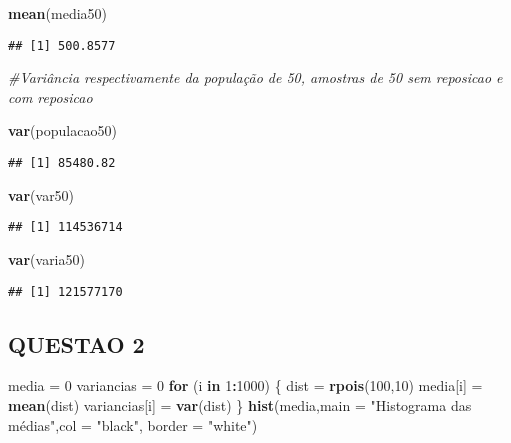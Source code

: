 \documentclass[]{article}
\newenvironment{Shaded}{\begin{snugshade}}{\end{snugshade}}
\newcommand{\KeywordTok}[1]{\textcolor[rgb]{0.13,0.29,0.53}{\textbf{#1}}}
\newcommand{\DataTypeTok}[1]{\textcolor[rgb]{0.13,0.29,0.53}{#1}}
\newcommand{\DecValTok}[1]{\textcolor[rgb]{0.00,0.00,0.81}{#1}}
\newcommand{\StringTok}[1]{\textcolor[rgb]{0.31,0.60,0.02}{#1}}
\newcommand{\CommentTok}[1]{\textcolor[rgb]{0.56,0.35,0.01}{\textit{#1}}}
\newcommand{\ControlFlowTok}[1]{\textcolor[rgb]{0.13,0.29,0.53}{\textbf{#1}}}
\newcommand{\OperatorTok}[1]{\textcolor[rgb]{0.81,0.36,0.00}{\textbf{#1}}}
\newcommand{\NormalTok}[1]{#1}
\begin{document}
\begin{Shaded}
\begin{Highlighting}[]
\KeywordTok{mean}\NormalTok{(media50)}
\end{Highlighting}
\end{Shaded}

\begin{verbatim}
## [1] 500.8577
\end{verbatim}

\begin{Shaded}
\begin{Highlighting}[]
 \CommentTok{#Variância respectivamente da população de 50, amostras de 50 sem reposicao e com reposicao}

\KeywordTok{var}\NormalTok{(populacao50)}
\end{Highlighting}
\end{Shaded}

\begin{verbatim}
## [1] 85480.82
\end{verbatim}

\begin{Shaded}
\begin{Highlighting}[]
\KeywordTok{var}\NormalTok{(var50)}
\end{Highlighting}
\end{Shaded}

\begin{verbatim}
## [1] 114536714
\end{verbatim}

\begin{Shaded}
\begin{Highlighting}[]
\KeywordTok{var}\NormalTok{(varia50)}
\end{Highlighting}
\end{Shaded}

\begin{verbatim}
## [1] 121577170
\end{verbatim}

\subsection{QUESTAO 2}\label{questao-2}

\begin{Shaded}
\begin{Highlighting}[]
\NormalTok{media =}\StringTok{ }\DecValTok{0}
\NormalTok{variancias =}\StringTok{ }\DecValTok{0}
\ControlFlowTok{for}\NormalTok{ (i }\ControlFlowTok{in} \DecValTok{1}\OperatorTok{:}\DecValTok{1000}\NormalTok{) \{}
\NormalTok{  dist =}\StringTok{ }\KeywordTok{rpois}\NormalTok{(}\DecValTok{100}\NormalTok{,}\DecValTok{10}\NormalTok{)}
\NormalTok{  media[i] =}\StringTok{ }\KeywordTok{mean}\NormalTok{(dist)}
\NormalTok{  variancias[i] =}\StringTok{ }\KeywordTok{var}\NormalTok{(dist)}
\NormalTok{\}}
\KeywordTok{hist}\NormalTok{(media,}\DataTypeTok{main =} \StringTok{"Histograma das médias"}\NormalTok{,}\DataTypeTok{col =} \StringTok{"black"}\NormalTok{, }\DataTypeTok{border =} \StringTok{"white"}\NormalTok{)}
\end{Highlighting}
\end{Shaded}
\end{document}
